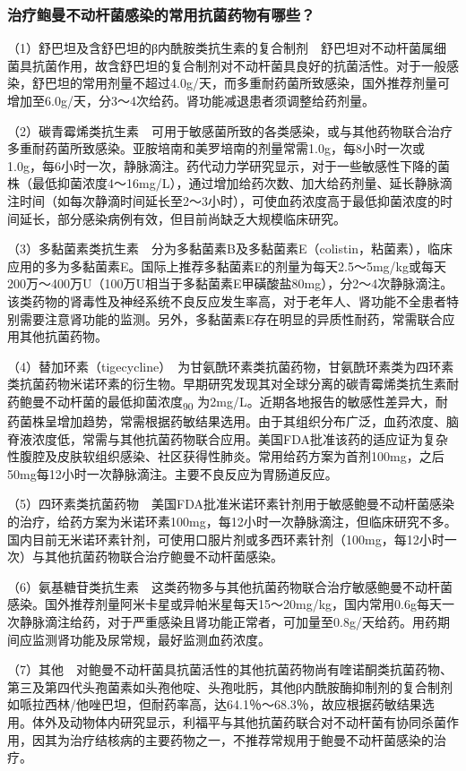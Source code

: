 \subsubsection{治疗鲍曼不动杆菌感染的常用抗菌药物有哪些？}

（1）舒巴坦及含舒巴坦的β内酰胺类抗生素的复合制剂　舒巴坦对不动杆菌属细菌具抗菌作用，故含舒巴坦的复合制剂对不动杆菌具良好的抗菌活性。对于一般感染，舒巴坦的常用剂量不超过4.0g/天，而多重耐药菌所致感染，国外推荐剂量可增加至6.0g/天，分3～4次给药。肾功能减退患者须调整给药剂量。

（2）碳青霉烯类抗生素　可用于敏感菌所致的各类感染，或与其他药物联合治疗多重耐药菌所致感染。亚胺培南和美罗培南的剂量常需1.0g，每8小时一次或1.0g，每6小时一次，静脉滴注。药代动力学研究显示，对于一些敏感性下降的菌株（最低抑菌浓度4～16mg/L），通过增加给药次数、加大给药剂量、延长静脉滴注时间（如每次静滴时间延长至2～3小时），可使血药浓度高于最低抑菌浓度的时间延长，部分感染病例有效，但目前尚缺乏大规模临床研究。

（3）多黏菌素类抗生素　分为多黏菌素B及多黏菌素E（colistin，粘菌素），临床应用的多为多黏菌素E。国际上推荐多黏菌素E的剂量为每天2.5～5mg/kg或每天200万～400万U（100万U相当于多黏菌素E甲磺酸盐80mg），分2～4次静脉滴注。该类药物的肾毒性及神经系统不良反应发生率高，对于老年人、肾功能不全患者特别需要注意肾功能的监测。另外，多黏菌素E存在明显的异质性耐药，常需联合应用其他抗菌药物。

（4）替加环素（tigecycline）　为甘氨酰环素类抗菌药物，甘氨酰环素类为四环素类抗菌药物米诺环素的衍生物。早期研究发现其对全球分离的碳青霉烯类抗生素耐药鲍曼不动杆菌的最低抑菌浓度\textsubscript{90}
为2mg/L。近期各地报告的敏感性差异大，耐药菌株呈增加趋势，常需根据药敏结果选用。由于其组织分布广泛，血药浓度、脑脊液浓度低，常需与其他抗菌药物联合应用。美国FDA批准该药的适应证为复杂性腹腔及皮肤软组织感染、社区获得性肺炎。常用给药方案为首剂100mg，之后50mg每12小时一次静脉滴注。主要不良反应为胃肠道反应。

（5）四环素类抗菌药物　美国FDA批准米诺环素针剂用于敏感鲍曼不动杆菌感染的治疗，给药方案为米诺环素100mg，每12小时一次静脉滴注，但临床研究不多。国内目前无米诺环素针剂，可使用口服片剂或多西环素针剂（100mg，每12小时一次）与其他抗菌药物联合治疗鲍曼不动杆菌感染。

（6）氨基糖苷类抗生素　这类药物多与其他抗菌药物联合治疗敏感鲍曼不动杆菌感染。国外推荐剂量阿米卡星或异帕米星每天15～20mg/kg，国内常用0.6g每天一次静脉滴注给药，对于严重感染且肾功能正常者，可加量至0.8g/天给药。用药期间应监测肾功能及尿常规，最好监测血药浓度。

（7）其他　对鲍曼不动杆菌具抗菌活性的其他抗菌药物尚有喹诺酮类抗菌药物、第三及第四代头孢菌素如头孢他啶、头孢吡肟，其他β内酰胺酶抑制剂的复合制剂如哌拉西林/他唑巴坦，但耐药率高，达64.1％～68.3％，故应根据药敏结果选用。体外及动物体内研究显示，利福平与其他抗菌药联合对不动杆菌有协同杀菌作用，因其为治疗结核病的主要药物之一，不推荐常规用于鲍曼不动杆菌感染的治疗。

